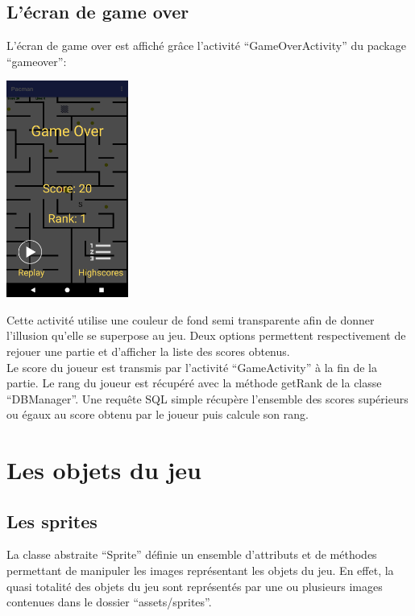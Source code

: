 \documentclass{article}
\begin{document}
\subsection{L'écran de game over}
L'écran de game over est affiché grâce l'activité \enquote{GameOverActivity} du package \enquote{gameover}:
\begin{center}
  \includegraphics[width=4cm]{game_over.png}
\end{center}
Cette activité utilise une couleur de fond semi transparente afin de donner l'illusion qu'elle se superpose au jeu.
Deux options permettent respectivement de rejouer une partie et d'afficher la liste des scores obtenus.\\

Le score du joueur est transmis par l'activité \enquote{GameActivity} à la fin de la partie.
Le rang du joueur est récupéré avec la méthode getRank de la classe \enquote{DBManager}.
Une requête SQL simple récupère l'ensemble des scores supérieurs ou égaux au score obtenu par le joueur puis calcule son rang.\\

\section{Les objets du jeu}
\subsection{Les sprites}
La classe abstraite \enquote{Sprite} définie un ensemble d'attributs et de méthodes permettant de manipuler les images représentant les objets du jeu.
En effet, la quasi totalité des objets du jeu sont représentés par une ou plusieurs images contenues dans le dossier \enquote{assets/sprites}.\\
\end{document}
